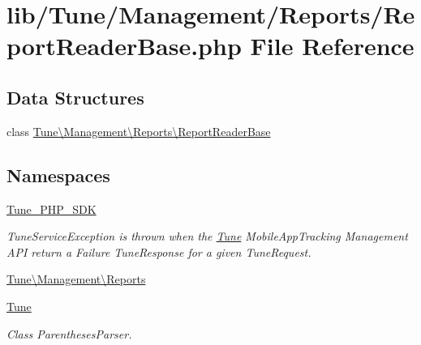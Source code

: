 \hypertarget{ReportReaderBase_8php}{\section{lib/\-Tune/\-Management/\-Reports/\-Report\-Reader\-Base.php File Reference}
\label{ReportReaderBase_8php}
}
\subsection*{Data Structures}
\begin{DoxyCompactItemize}
\item 
class \hyperlink{classTune_1_1Management_1_1Reports_1_1ReportReaderBase}{Tune\textbackslash{}\-Management\textbackslash{}\-Reports\textbackslash{}\-Report\-Reader\-Base}
\end{DoxyCompactItemize}
\subsection*{Namespaces}
\begin{DoxyCompactItemize}
\item 
\hyperlink{namespaceTune__PHP__SDK}{Tune\-\_\-\-P\-H\-P\-\_\-\-S\-D\-K}
\begin{DoxyCompactList}\small\item\em Tune\-Service\-Exception is thrown when the \hyperlink{namespaceTune}{Tune} Mobile\-App\-Tracking Management A\-P\-I return a Failure Tune\-Response for a given Tune\-Request. \end{DoxyCompactList}\item 
\hyperlink{namespaceTune_1_1Management_1_1Reports}{Tune\textbackslash{}\-Management\textbackslash{}\-Reports}
\item 
\hyperlink{namespaceTune}{Tune}
\begin{DoxyCompactList}\small\item\em Class Parentheses\-Parser. \end{DoxyCompactList}\end{DoxyCompactItemize}
